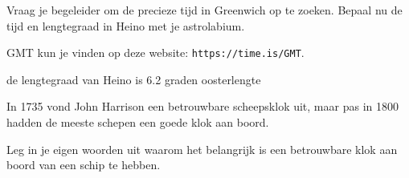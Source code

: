\begin{opgave}
 Vraag je begeleider om de precieze tijd in Greenwich op te zoeken. Bepaal nu de tijd en lengtegraad in Heino met je astrolabium.
 \begin{hint}
  GMT kun je vinden op deze website: \texttt{https://time.is/GMT}.
 \end{hint}
\begin{antwoord}
 de lengtegraad van Heino is 6.2 graden oosterlengte
\end{antwoord}
\end{opgave}

In 1735 vond John Harrison een betrouwbare scheepsklok uit, maar pas in 1800 hadden de meeste schepen een goede klok aan boord.
\begin{opgave}
 Leg in je eigen woorden uit waarom het belangrijk is een betrouwbare klok aan boord van een schip te hebben.
\end{opgave}


\newpage